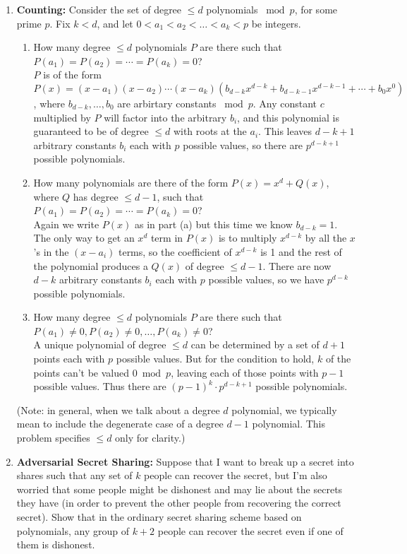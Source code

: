 \documentclass[11pt,fleqn]{article}
\begin{document}
\begin{enumerate}
\newpage
\item \textbf{Counting:}
Consider the set of degree $\leq d$ polynomials $\bmod p$, for some prime $p$.
Fix $k < d$, and let $0 < a_1 < a_2 < \ldots < a_k < p$ be integers.
\begin{enumerate} 
\item How many degree $\leq d$ polynomials $P$ are there such that $P(a_1) = P(a_2) = \cdots = P(a_k) = 0$? \\
$P$ is of the form $P(x) = (x-a_1)(x-a_2)\cdots(x-a_k)(b_{d-k}x^{d-k} + b_{d-k-1}x^{d-k-1} + \cdots + b_0x^0)$, where $b_{d-k},\ldots,b_0$ are arbirtary constants $\bmod p$. Any constant $c$ multiplied by $P$ will factor into the arbitrary $b_i$, and this polynomial is guaranteed to be of degree $\leq d$ with roots at the $a_i$. This leaves $d-k+1$ arbitrary constants $b_i$ each with $p$ possible values, so there are $p^{d-k+1}$ possible polynomials.
\item How many polynomials are there of the form $P(x) = x^d + Q(x)$, where $Q$ has degree $\leq d-1$,
such that $P(a_1) = P(a_2) = \cdots = P(a_k) = 0$? \\
Again we write $P(x)$ as in part (a) but this time we know $b_{d-k} = 1$. The only way to get an $x^d$ term in $P(x)$ is to multiply $x^{d-k}$ by all the $x$'s in the $(x-a_i)$ terms, so the coefficient of $x^{d-k}$ is 1 and the rest of the polynomial produces a $Q(x)$ of degree $\leq d-1$. There are now $d-k$ arbitrary constants $b_i$ each with $p$ possible values, so we have $p^{d-k}$ possible polynomials.
\item How many degree $\leq d$ polynomials $P$ are there such that $P(a_1) \neq 0, P(a_2) \neq 0, \ldots, P(a_k) \neq 0$? \\
A unique polynomial of degree $\leq d$ can be determined by a set of $d+1$ points each with $p$ possible values. But for the condition to hold, $k$ of the points can't be valued $0 \bmod p$, leaving each of those points with $p-1$ possible values. Thus there are $(p-1)^k \cdot p^{d-k+1}$ possible polynomials.
\end{enumerate}
(Note: in general, when we talk about a degree $d$ polynomial,
we typically mean to include the degenerate case of a degree $d-1$ polynomial.
This problem specifies $\leq d$ only for clarity.)

\newpage
\item \textbf{Adversarial Secret Sharing:} Suppose 
that I want to break up a secret into shares such that any set of $k$ people can recover the secret,
but I'm also worried that some people might be dishonest and may lie about the secrets they have 
(in order to prevent the other people from recovering the correct secret). 
Show that in the ordinary secret sharing scheme based on polynomials,
any group of $k+2$ people can recover the secret even if one of them is dishonest.


\end{enumerate}
\end{document}
